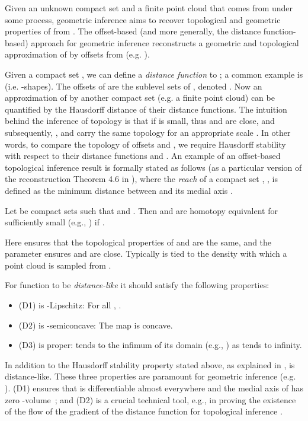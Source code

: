 \documentclass[11pt]{myclass}
\begin{document}
Given an unknown compact set  and a finite point cloud  that comes from  under some process, geometric inference aims to recover topological and geometric properties of  from . The offset-based (and more generally, the distance function-based) approach for geometric inference reconstructs a geometric and topological approximation of  by offsets from  (e.g. \cite{ChazalCohen-SteinerLieutier2009b,ChazalCohen-SteinerLieutier2009,ChazalCohen-SteinerMerigot2011,ChazalLieutier2005,ChazalLieutier2006}).  


Given a compact set , we can define a \emph{distance function}  to  ; a common example is  (i.e. -shapes).
The offsets of  are the sublevel sets of , denoted .
Now an approximation of  by another compact set  (e.g. a finite point cloud) can be quantified by the Hausdorff distance  of their distance functions. 
The intuition behind the inference of topology is that if  is small, thus  and  are close, and subsequently, ,  and  carry the same topology for an appropriate scale . 
In other words, to compare the topology of offsets  and , 
we require Hausdorff stability with respect to their distance functions  and .  
 An example of an offset-based topological inference result is formally stated as follows (as a particular version of the reconstruction Theorem 4.6 in \cite{ChazalCohen-SteinerLieutier2009}), 
 where the \emph{reach} of a compact set , , is defined as the minimum distance between  and its medial axis \cite{Merigot2010}. 

\begin{theorem}
\label{thm:recon-fP}
Let  be compact sets such that  and . Then  and  are homotopy equivalent for sufficiently small  (e.g., ) if .
\end{theorem}



Here  ensures that the topological properties of  and  are the same, and the  parameter ensures  and  are close.  
Typically  is tied to the density with which a point cloud  is sampled from .  

For function  to be \emph{distance-like} it should satisfy the following properties:
\begin{itemize} \denselist
\item (D1)   is -Lipschitz:  For all , .  
\item (D2)   is -semiconcave:  The map  is concave.  
\item (D3)    is proper:  tends to the infimum of its domain (e.g., ) as  tends to infinity.  
\end{itemize}
In addition to the Hausdorff stability property stated above, as explained in \cite{ChazalCohen-SteinerMerigot2011},  is distance-like.  These three properties are paramount for geometric inference (e.g. \cite{ChazalCohen-SteinerLieutier2009,Lieutier2004}).  
(D1) ensures that  is differentiable almost everywhere and the medial axis of  has zero -volume~\cite{ChazalCohen-SteinerMerigot2011}; and (D2) is a crucial technical tool, e.g., in proving the existence of the flow of the gradient of the distance function for topological inference \cite{ChazalCohen-SteinerLieutier2009}. 
\end{document}
